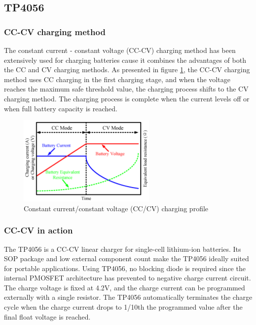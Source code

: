 \documentclass[\main/main.tex]{subfiles}
\begin{document}
\subsection{TP4056}

\subsubsection{CC-CV charging method}
The constant current - constant voltage (CC-CV) charging method has been extensively used for charging batteries cause it combines the advantages of both the CC and CV charging methods. As presented in figure \ref{fig:tp4056_cc_cv_profile}, the CC-CV charging method uses CC charging in the first charging stage, and when the voltage reaches the maximum safe threshold value, the charging process shifts to the CV charging method. The charging process is complete when the current levels off or when full battery capacity is reached.

\begin{figure}[H]
    \begin{center}
        \includegraphics[width=0.6\textwidth]{tp4056_cc_cv_profile.png}
    \end{center}
    \caption{Constant current/constant voltage (CC/CV) charging profile}
    \label{fig:tp4056_cc_cv_profile}
\end{figure}

\subsubsection{CC-CV in action}
The TP4056 is a CC-CV linear charger for single-cell lithium-ion batteries. Its SOP package and low external component count make the TP4056 ideally suited for portable applications. Using TP4056, no blocking diode is required since the internal PMOSFET architecture has prevented to negative charge current circuit. The charge voltage is
fixed at 4.2V, and the charge current can be programmed externally with a single resistor. The TP4056 automatically terminates the charge cycle when the charge current drops to 1/10th the programmed value after the final float voltage is reached. 
\end{document}
